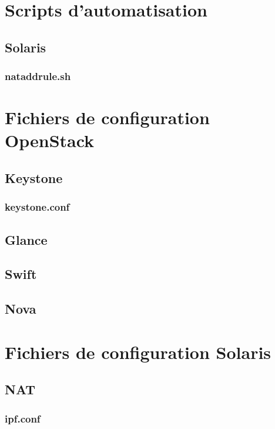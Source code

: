 \documentclass[a4paper,oneside]{report}
\begin{document}
\chapter{Scripts d'automatisation}
\section{Solaris}
\subsection{nataddrule.sh}

\chapter{Fichiers de configuration OpenStack}
\section{Keystone}
\subsection{keystone.conf}

\section{Glance}

\section{Swift}

\section{Nova}

\chapter{Fichiers de configuration Solaris}
\section{NAT}
\subsection{ipf.conf} \label{conf:NAT}
\end{document}
